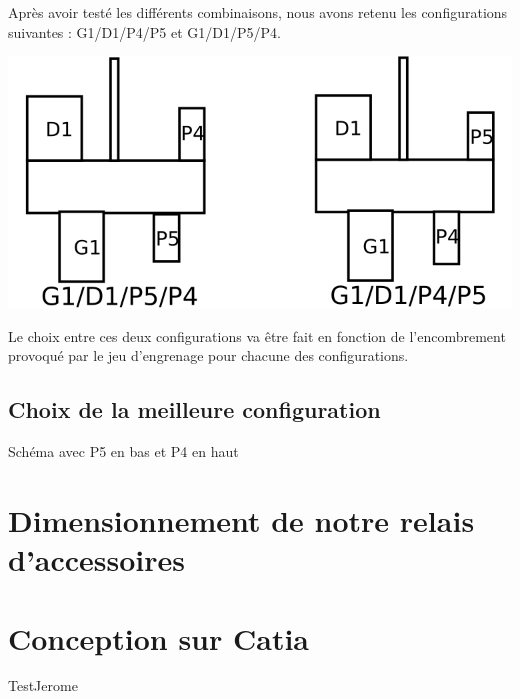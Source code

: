 \documentclass{config}
\begin{document}
\begin{spacing}{1.2}
Après avoir testé les différents combinaisons, nous avons retenu les configurations suivantes : G1/D1/P4/P5 et G1/D1/P5/P4.

\begin{center}
\includegraphics[scale=0.75]{conf_retenu.png}
\end{center}

Le choix entre ces deux configurations va être fait en fonction de l'encombrement provoqué par le jeu d'engrenage pour chacune des configurations.

\newpage
\subsection{Choix de la meilleure configuration}
Schéma avec P5 en bas et P4 en haut

\section{Dimensionnement de notre relais d'accessoires}

\section{Conception sur Catia}
TestJerome


\end{spacing}
\end{document}
